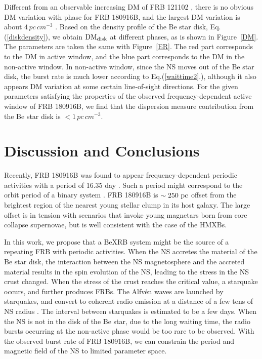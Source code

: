 \documentclass[twocolumn]{aastex62}
\begin{document}
Different from an observable increasing DM of FRB 121102 \citep[e.g.,][]{oos20, zhao21}, there is no obvious DM variation with phase for FRB 180916B, and the largest DM variation is about $ 4 \,\unit{pc\,cm^{-3}}$ \citep[see top panel of Extended Figure 7 in][]{pas20}.  
Based on the density profile of the Be star disk, Eq.(\ref{diskdensity}), we obtain $\rm{DM_{disk}}$ at different phases, as is shown in Figure~\ref{DM}. 
The parameters are taken the same with Figure~\ref{ER}.
The red part corresponds to the DM in active window, and the blue part corresponds to the DM in the non-active window. In non-active window, since the NS moves out of the Be star disk, the burst rate is much lower according to Eq.(\ref{waittime2}.), although it also appears DM variation at some certain line-of-sight directions.
For the given parameters satisfying the properties of the observed frequency-dependent active window of FRB 180916B,
we find that the dispersion measure contribution from the Be star disk is  $< 1 \,\unit{pc\,cm^{-3}}$. 

\section{Discussion and Conclusions}\label{sec3}

Recently, FRB 180916B was found to appear frequency-dependent periodic activities with a period of 16.35 day \citep{Chime/Frb2020}. Such a period might correspond to the orbit period of a binary system \citep{dai16, sma19, iok20, lyu20, dai20b, gu20, mot20, dec21, kue21, den21, wad21}.
FRB 180916B is $\sim250~{\rm pc}$ offset from the brightest region of the nearest young stellar clump in its host galaxy. The large offset is in tension with scenarios that invoke young magnetars born from core collapse supernovae, but is well consistent with the case of the HMXBs.

In this work, we propose that a BeXRB system might be the source of a repeating FRB with periodic activities.
When the NS accretes the material of the Be star disk, the interaction between the NS magnetosphere and the accreted material results in the spin evolution of the NS, leading to the stress in the NS crust changed.
When the stress of the crust reaches the critical value, a starquake occurs, and further produces FRBs.
The Alfv\'en waves are launched by starquakes, and convert to coherent radio emission at a distance of a few tens of NS radius \citep{kum20,lu20,yan21}.
The interval between starquakes is estimated to be a few days.
When the NS is not in the disk of the Be star, due to the long waiting time, the radio bursts occurring at the non-active phase would be too rare to be observed.
With the observed burst rate of FRB 180916B, we can constrain the period and magnetic field of the NS to limited parameter space.
\end{document}
